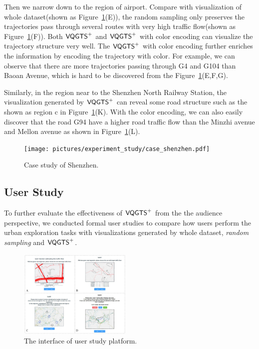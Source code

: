 Then we narrow down to the region of airport. Compare with visualization of whole dataset(shown as Figure~\ref{fig:shenzhen}(E)), the random sampling only preserves the trajectories pass through several routes with very high traffic flow(shown as Figure~\ref{fig:shenzhen}(F)).  Both $\mathsf{VQGTS}^{+}$ and $\mathsf{VQGTS}^{+}$ with color encoding can visualize the trajectory structure very well. The $\mathsf{VQGTS}^{+}$ with color encoding further enriches the information by encoding the trajectory with color. For example, we can observe that there are more trajectories passing through G4 and G104 than Baoan Avenue, which is hard to be discovered from the Figure~\ref{fig:shenzhen}(E,F,G).  

Similarly, in the region near to the Shenzhen North Railway Station, the visualization generated by $\mathsf{VQGTS}^{+}$ can reveal some road structure such as the  shown as region c in Figure~\ref{fig:shenzhen}(K). With the color encoding, we can also easily discover that the road G94 have a higher road traffic flow than the Minzhi avenue and Mellon avenue as shown in Figure~\ref{fig:shenzhen}(L).

\begin{figure}[t]
	\centering
	\vspace{2mm}
	\texttt{[image: pictures/experiment\_study/case\_shenzhen.pdf]}
	\caption{Case study of Shenzhen.}
	\vspace{0mm}
	\label{fig:shenzhen}
\end{figure}


\subsection{User Study}
To further evaluate the effectiveness of $\mathsf{VQGTS}^{+}$ from the the audience perspective, we conducted formal user studies to compare how users perform the urban exploration tasks with visualizations generated by whole dataset, \textit{random sampling} and $\mathsf{VQGTS}^{+}$.


\begin{figure}[t]
	\centering
	\includegraphics[width=0.48\textwidth]{pictures/user_study/interface.pdf}
	\vspace{-3mm}
	\caption{The interface of user study platform.}
	\vspace{-5mm}
	\label{fig:user_study}
\end{figure}

